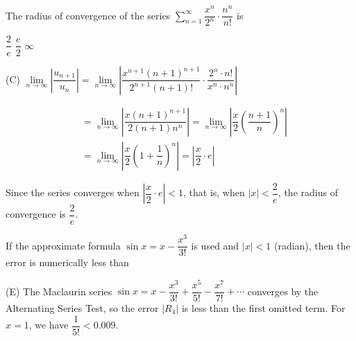 \newpage




\question
The radius of convergence of the series $\sum\limits_{n=1}^{\infty} \dfrac{x^{n}}{2^{n}} \cdot \dfrac{n^{n}}{n!}$ is
\begin{choices}
  \CorrectChoice $\dfrac{2}{e}$
  \choice $\dfrac{e}{2}$
  \choice $\infty$
\end{choices}
\begin{solution}
(C) $\lim\limits_{n \to \infty}\left|\dfrac{u_{n+1}}{u_{n}}\right|=\lim\limits_{n \to \infty}\left|\dfrac{x^{n+1}(n+1)^{n+1}}{2^{n+1}(n+1)!} \cdot \dfrac{2^{n} \cdot n!}{x^{n} \cdot n^{n}}\right|$

\[
\begin{aligned}
& =\lim\limits_{n \to \infty}\left|\dfrac{x(n+1)^{n+1}}{2(n+1) n^{n}}\right|=\lim\limits_{n \to \infty}\left|\dfrac{x}{2}\left(\dfrac{n+1}{n}\right)^{n}\right| \\
& =\lim\limits_{n \to \infty}\left|\dfrac{x}{2}\left(1+\dfrac{1}{n}\right)^{n}\right|=\left|\dfrac{x}{2} \cdot e\right|
\end{aligned}
\]

Since the series converges when $\left|\dfrac{x}{2} \cdot e\right|<1$, that is, when $|x|<\dfrac{2}{e}$, the radius of convergence is $\dfrac{2}{e}$.
\end{solution}

\question
If the approximate formula $\sin x=x-\dfrac{x^{3}}{3!}$ is used and $|x|<1$ (radian), then the error is numerically less than
\begin{choices}
\end{choices}
\begin{solution}
(E) The Maclaurin series $\sin x=x-\dfrac{x^{3}}{3!}+\dfrac{x^{5}}{5!}-\dfrac{x^{7}}{7!}+\cdots$ converges by the Alternating Series Test, so the error $\left|R_{4}\right|$ is less than the first omitted term. For $x=1$, we have $\dfrac{1}{5!}<0.009$.
\end{solution}



\newpage




